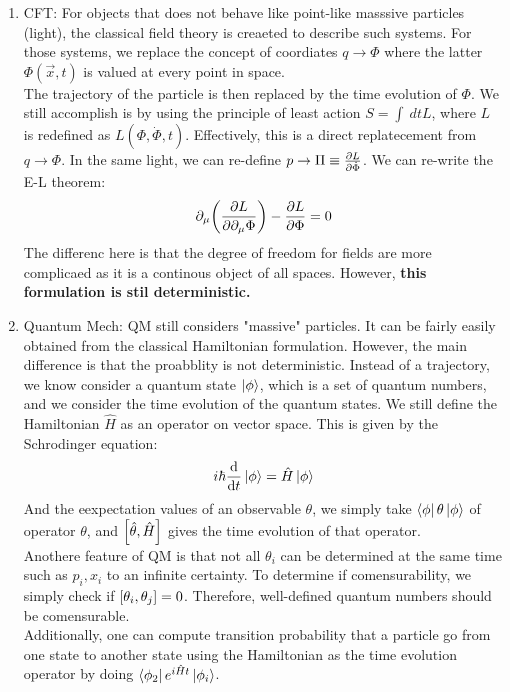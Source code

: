 \documentclass{article}
\begin{document}
\begin{enumerate}
 \item CFT: For objects that does not behave like point-like masssive particles (light), the classical field theory is creaeted to describe such systems. For those systems, we replace the concept of coordiates $q \to \Phi $ where the latter $\Phi (\vec{x} ,t)$ is valued at every point in space. \\ 
   The trajectory of the particle is then replaced by the time evolution of $\Phi $. We still accomplish is by using the principle of least action $S = \int \ dt L $, where $L$ is redefined as $L(\Phi,\dot{\Phi},t)$. Effectively, this is a direct replatecement from $q \to \Phi $. In the same light, we can re-define $p \to \Pi \equiv \pdv{L}{\dot{\Phi}}$. We can re-write the E-L theorem:
   \begin{equation*}
     \partial_\mu\qty(\pdv{L}{\partial_\mu \Phi }) - \pdv{L}{\Phi } = 0
   \end{equation*}
   The differenc here is that the degree of freedom for fields are more complicaed as it is a continous object of all spaces. However, \textbf{this formulation is stil deterministic.}
 \item Quantum Mech: QM still considers "massive" particles. It can be fairly easily obtained from the classical Hamiltonian formulation. However, the main difference is that the proabblity is not deterministic. Instead of a trajectory, we know consider a quantum state $\ket{\phi} $, which is  a set of quantum numbers, and we consider the time evolution of the quantum states. We still define the Hamiltonian $\hat{H}$ as an operator on vector space. This is given by the Schrodinger equation:
  \begin{equation*}
  i \hbar \dv{t} \ket{\phi } = \hat{H} \ket{\phi }
  \end{equation*}
  And the eexpectation values of an observable $\theta$, we simply take $\bra{\phi } \theta \ket{\phi }  $ of operator $\theta $, and $\qty[\hat{\theta } , \hat{H} ]$ gives the time evolution of that operator. \\ 
  Anothere feature of QM is that not all $\theta _i$ can be determined at the same time such as $p_i, x_i$ to an infinite certainty. To determine if comensurability, we simply check if $\qty[\theta_i, \theta _j] = 0$. Therefore, well-defined quantum numbers should be comensurable. \\ 
  Additionally, one can compute transition probability that a particle go from one state to another state using the Hamiltonian as the time evolution operator by doing $\bra{\phi _2} e^{i \hat{H}t } \ket{\phi _i} $.


\end{enumerate}
\end{document}
